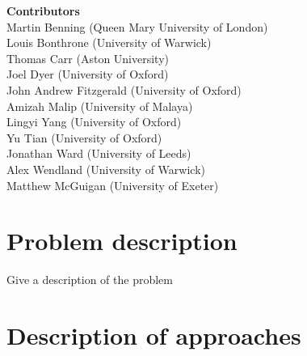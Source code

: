 \documentclass[12pt]{article}
\begin{document}
\begin{center}
    \large\textbf{Contributors}\\
    \vskip1cm
    \normalsize Martin Benning (Queen Mary University of London)\\
    \normalsize Louis Bonthrone (University of Warwick)\\
    \normalsize Thomas Carr (Aston University)\\
    \normalsize Joel Dyer (University of Oxford)\\
    \normalsize John Andrew Fitzgerald (University of Oxford)\\
    \normalsize Amizah Malip (University of Malaya)\\
    \normalsize Lingyi Yang (University of Oxford)\\
    \normalsize Yu Tian (University of Oxford)\\
    \normalsize Jonathan Ward (University of Leeds)\\
    \normalsize Alex Wendland (University of Warwick)\\
    \normalsize Matthew McGuigan (University of Exeter)
\end{center}
\newpage

\tableofcontents
\newpage




\section{Problem description}
Give a description of the problem







\section{Description of approaches}
\end{document}
